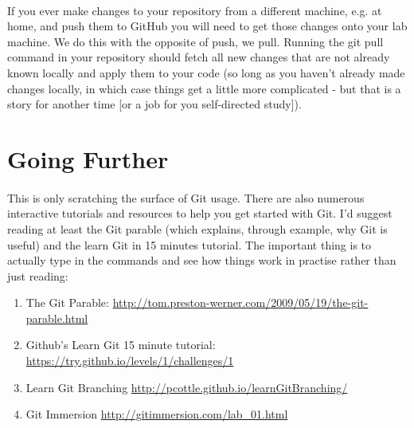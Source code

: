 \documentclass[10pt, a4paper, twosize]{article}
\begin{document}
\paragraph{} If you ever make changes to your repository from a different machine, e.g. at home, and push them to GitHub you will need to get those changes onto your lab machine. We do this with the opposite of push, we pull. Running the git pull command in your repository should fetch all new changes that are not already known locally and apply them to your code (so long as you haven't already made changes locally, in which case things get a little more complicated - but that is a story for another time [or a job for you self-directed study]).

\section{Going Further}

\paragraph{} This is only scratching the surface of Git usage.  There are also numerous interactive tutorials and resources to help you get started with Git. I'd suggest reading at least the Git parable (which explains, through example, why Git is useful) and the learn Git in 15 minutes tutorial. The important thing is to actually type in the commands and see how things work in practise rather than just reading:
\begin{enumerate}
\item The Git Parable: \url{http://tom.preston-werner.com/2009/05/19/the-git-parable.html}
\item Github's Learn Git 15 minute tutorial: \url{https://try.github.io/levels/1/challenges/1}
\item Learn Git Branching \url{http://pcottle.github.io/learnGitBranching/}
\item Git Immersion \url{http://gitimmersion.com/lab_01.html}
\end{enumerate}





\end{document}
